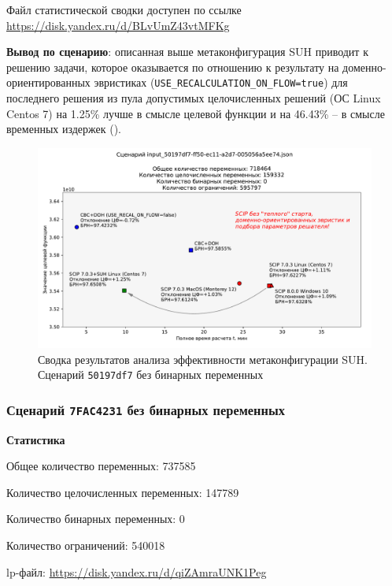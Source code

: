 \documentclass[%
	11pt,
	a4paper,
	utf8,
		]{article}
\begin{document}
Файл статистической сводки доступен по ссылке \url{https://disk.yandex.ru/d/BLvUmZ43vtMFKg}

\vspace*{3mm}
\textbf{Вывод по сценарию}: описанная выше метаконфигурация SUH приводит к решению задачи, которое оказывается по отношению к результату на доменно-ориентированных эвристиках (\verb|USE_RECALCULATION_ON_FLOW=true|) для последнего решения из пула допустимых целочисленных решений (ОС Linux Centos 7) на 1.25\% лучше в смысле целевой функции и на 46.43\% -- в смысле временных издержек ().

\begin{figure}[!h]
	\centering
	\includegraphics[scale=0.6]{figures/summary_50197df7.pdf}
	\caption{Сводка результатов анализа эффективности метаконфигурации SUH. \\Сценарий \texttt{50197df7} без бинарных переменных}\label{fig:summary_50197df7}
\end{figure}

\subsubsection{Сценарий \texttt{7FAC4231} без бинарных переменных}

\textbf{Статистика}\vspace*{1mm}

Общее количество переменных: 737585

Количество целочисленных переменных: 147789

Количество бинарных переменных: 0

Количество ограничений: 540018

lp-файл: \url{https://disk.yandex.ru/d/qiZAmraUNK1Peg}
\end{document}

